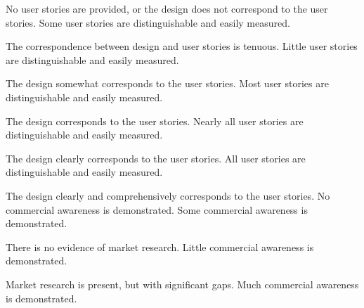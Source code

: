 \documentclass{../../fal_assignment}
\begin{document}
\begin{markingrubric}
%
        \grade\fail No user stories are provided, or the design does not correspond to the user stories.
        \grade Some user stories are distinguishable and easily measured.
            \par The correspondence between design and user stories is tenuous.
        \grade Little user stories are distinguishable and easily measured.
            \par The design somewhat corresponds to the user stories.
        \grade Most user stories are distinguishable and easily measured.
            \par The design corresponds to the user stories.
        \grade Nearly all user stories are distinguishable and easily measured.
            \par The design clearly corresponds to the user stories.
        \grade All user stories are distinguishable and easily measured.
            \par The design clearly and comprehensively corresponds to the user stories.
%
        \grade\fail No commercial awareness is demonstrated.
        \grade Some commercial awareness is demonstrated.
            \par There is no evidence of market research.
        \grade Little commercial awareness is demonstrated.
            \par Market research is present, but with significant gaps.
        \grade Much commercial awareness is demonstrated.

\end{markingrubric}
\end{document}
